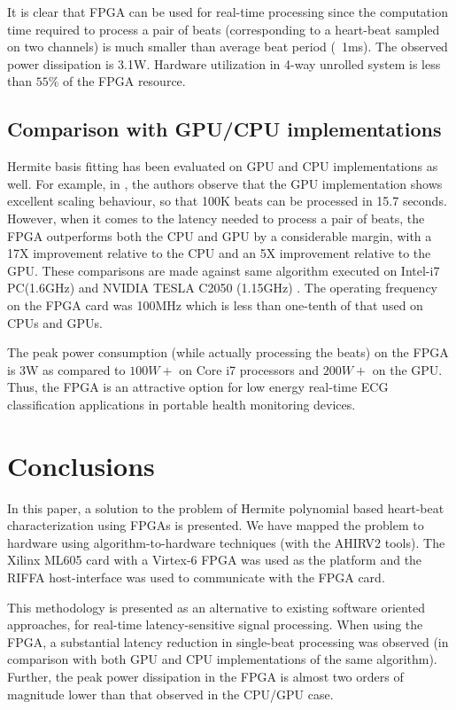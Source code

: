 \documentclass[runningheads]{llncs}
\begin{document}
It is clear that FPGA can be used for real-time processing since the 
computation time required to process a pair of beats (corresponding
to a heart-beat sampled on two channels) is much smaller than
average beat period (~1ms). The observed power dissipation is 3.1W.  
Hardware utilization in 4-way unrolled system is less than $55\%$ 
of the FPGA resource.

\subsection{Comparison with GPU/CPU implementations}

Hermite basis fitting has been evaluated on GPU and CPU implementations
as well.  For example, in \cite{c:GPU}, the authors observe that
the GPU implementation shows excellent scaling behaviour, so that 
100K beats can be processed in 15.7 seconds.  However, when it comes
to the latency needed to process a pair of beats, the FPGA outperforms both 
the CPU and GPU by a considerable margin, with a 17X improvement relative to
the CPU and an 5X improvement relative to the GPU. 
These comparisons are made against same algorithm executed on Intel-i7 PC(1.6GHz) 
and NVIDIA TESLA C2050 (1.15GHz) \cite{c:GPU}. The operating frequency on the FPGA
card was 100MHz which is less than one-tenth of that used on CPUs and GPUs.

The peak power consumption (while actually processing the beats) on the FPGA is 3W as compared to $100W+$ on Core i7 processors and
$200W+$ on the GPU.  %
Thus, the FPGA is an attractive option for low energy real-time ECG classification
applications in portable health monitoring devices.

\section{Conclusions}\label{s:conclusions}

In this paper, a solution to the problem of Hermite polynomial
based heart-beat characterization using FPGAs is presented.
We have mapped the problem to hardware using algorithm-to-hardware
techniques (with the AHIRV2 tools).  The Xilinx ML605 card with a
Virtex-6 FPGA was used as the platform and the RIFFA host-interface was used to
communicate with the FPGA card. 

This methodology is presented as an alternative to existing software oriented approaches, 
for real-time latency-sensitive signal processing. When using the FPGA, a substantial
latency reduction in single-beat processing was observed (in comparison with both
GPU and CPU implementations of the same algorithm).  
Further, the peak power dissipation in
the FPGA is almost two orders of magnitude lower than that observed in the CPU/GPU case.
\end{document}
